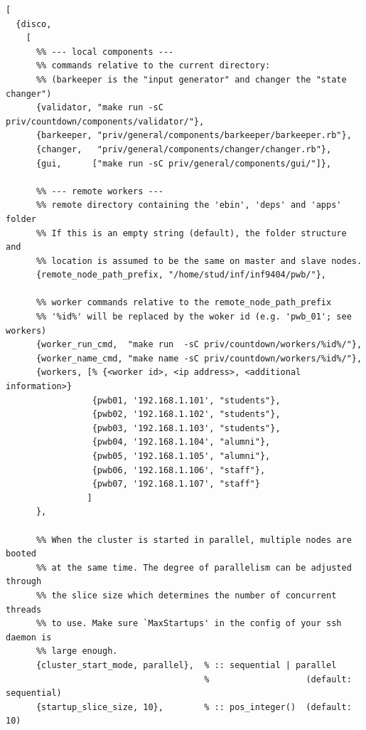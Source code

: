 \documentclass[a4paper, 12pt]{article}
\begin{document}
\begin{lstlisting}
[
  {disco,
    [
      %% --- local components ---
      %% commands relative to the current directory:
      %% (barkeeper is the "input generator" and changer the "state changer")
      {validator, "make run -sC priv/countdown/components/validator/"},
      {barkeeper, "priv/general/components/barkeeper/barkeeper.rb"},
      {changer,   "priv/general/components/changer/changer.rb"},
      {gui,      ["make run -sC priv/general/components/gui/"]},

      %% --- remote workers ---
      %% remote directory containing the 'ebin', 'deps' and 'apps' folder
      %% If this is an empty string (default), the folder structure and
      %% location is assumed to be the same on master and slave nodes.
      {remote_node_path_prefix, "/home/stud/inf/inf9404/pwb/"},

      %% worker commands relative to the remote_node_path_prefix
      %% '%id%' will be replaced by the woker id (e.g. 'pwb_01'; see workers)
      {worker_run_cmd,  "make run  -sC priv/countdown/workers/%id%/"},
      {worker_name_cmd, "make name -sC priv/countdown/workers/%id%/"},
      {workers, [% {<worker id>, <ip address>, <additional information>}
                 {pwb01, '192.168.1.101', "students"},
                 {pwb02, '192.168.1.102', "students"},
                 {pwb03, '192.168.1.103', "students"},
                 {pwb04, '192.168.1.104', "alumni"},
                 {pwb05, '192.168.1.105', "alumni"},
                 {pwb06, '192.168.1.106', "staff"},
                 {pwb07, '192.168.1.107', "staff"}
                ]
      },

      %% When the cluster is started in parallel, multiple nodes are booted
      %% at the same time. The degree of parallelism can be adjusted through
      %% the slice size which determines the number of concurrent threads
      %% to use. Make sure `MaxStartups' in the config of your ssh daemon is
      %% large enough.
      {cluster_start_mode, parallel},  % :: sequential | parallel
                                       %                   (default: sequential)
      {startup_slice_size, 10},        % :: pos_integer()  (default: 10)


\end{lstlisting}
\end{document}

